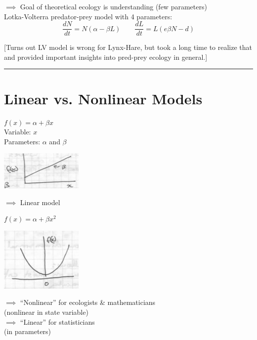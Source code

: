 \documentclass{article}
\begin{document}
$\implies$ Goal of theoretical ecology is understanding (few parameters)\\

Lotka-Volterra predator-prey model with 4 parameters:
\begin{equation*}
	\frac{dN}{dt} = N (\alpha - \beta L)  \quad  \quad
	\frac{dL}{dt}  =  L (e \beta N - d)	
\end{equation*}

[Turns out LV model is wrong for Lynx-Hare, but took a long time to realize that and provided important insights into pred-prey ecology in general.]

\rule[0.5ex]{\linewidth}{1pt}

\pagebreak

\section*{Linear vs. Nonlinear Models}
\begin{multicols}{3}
	$f(x) = \alpha + \beta x$\\
	Variable:  $x$\\
	Parameters:  $\alpha$ and $\beta$\\
	
	\columnbreak
	
	\includegraphics[width=4cm]{figs/img6}
	
	\columnbreak
	
	 $\implies$ Linear model 
\end{multicols}

\begin{multicols}{3}
	$f(x) = \alpha + \beta x^2$\\
	
	\columnbreak
	
	\includegraphics[width=4cm]{figs/img7}
	
	\columnbreak
	
	$\implies$ ``Nonlinear''  for ecologists \& mathematicians\\
	(nonlinear in state variable)\\
	$\implies$ ``Linear'' for statisticians\\
	(in parameters)
\end{multicols}
\end{document}
